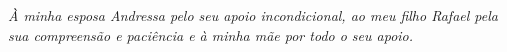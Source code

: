 \newpage

\vspace*{20cm}

\hspace{8cm}
\begin{minipage}{.45\textwidth}
\textit{À minha esposa Andressa pelo seu apoio incondicional, ao meu filho Rafael pela sua compreensão e paciência e à minha mãe por todo o seu apoio.}
\end{minipage}
